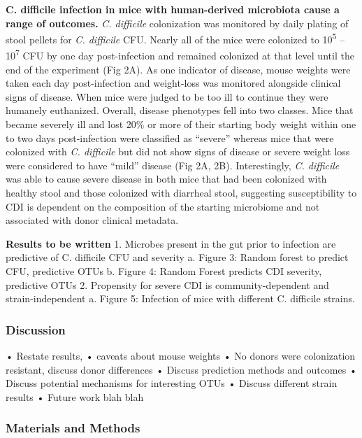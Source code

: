 \documentclass[11pt,]{article}
\begin{document}
\textbf{C. difficile infection in mice with human-derived microbiota
cause a range of outcomes.} \emph{C. difficile} colonization was
monitored by daily plating of stool pellets for \emph{C. difficile} CFU.
Nearly all of the mice were colonized to 10\textsuperscript{5} --
10\textsuperscript{7} CFU by one day post-infection and remained
colonized at that level until the end of the experiment (Fig 2A). As one
indicator of disease, mouse weights were taken each day post-infection
and weight-loss was monitored alongside clinical signs of disease. When
mice were judged to be too ill to continue they were humanely
euthanized. Overall, disease phenotypes fell into two classes. Mice that
became severely ill and lost 20\% or more of their starting body weight
within one to two days post-infection were classified as ``severe''
whereas mice that were colonized with \emph{C. difficile} but did not
show signs of disease or severe weight loss were considered to have
``mild'' disease (Fig 2A, 2B). Interestingly, \emph{C. difficile} was
able to cause severe disease in both mice that had been colonized with
healthy stool and those colonized with diarrheal stool, suggesting
susceptibility to CDI is dependent on the composition of the starting
microbiome and not associated with donor clinical metadata.

\textbf{Results to be written} 1. Microbes present in the gut prior to
infection are predictive of C. difficile CFU and severity a. Figure 3:
Random forest to predict CFU, predictive OTUs b. Figure 4: Random Forest
predicts CDI severity, predictive OTUs 2. Propensity for severe CDI is
community-dependent and strain-independent a. Figure 5: Infection of
mice with different C. difficile strains.

\subsubsection{Discussion}\label{discussion}

• Restate results, • caveats about mouse weights • No donors were
colonization resistant, discuss donor differences • Discuss prediction
methods and outcomes • Discuss potential mechanisms for interesting OTUs
• Discuss different strain results • Future work blah blah

\subsubsection{Materials and Methods}\label{materials-and-methods}
\end{document}
